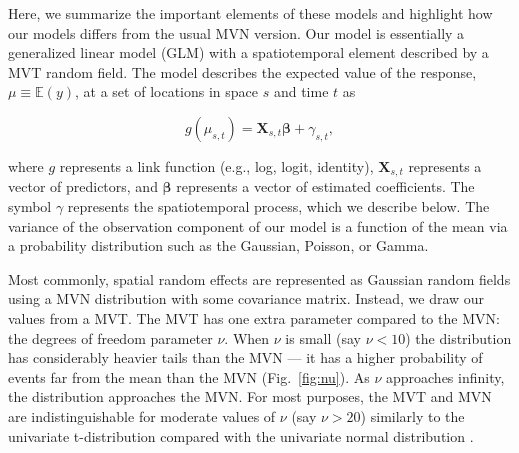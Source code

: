 \documentclass[12pt,english]{article}
\begin{document}
\begin{spacing}{1.3}
Here, we summarize the important elements of these models and highlight how
our models differs from the usual MVN version. Our model is essentially a
generalized linear model (GLM) with a spatiotemporal element described by a
MVT random field. The model describes the expected value of the response, $\mu
\equiv \mathbb{E}(y)$, at a set of locations in space $s$ and time $t$ as

\begin{equation}
  g(\mu_{s,t}) = \bm{X}_{s,t} \bm{\beta} + \gamma_{s,t},
\end{equation}

\noindent where $g$ represents a link function (e.g., log, logit, identity),
$\bm{X}_{s,t}$ represents a vector of predictors, and $\bm{\beta}$ represents a
vector of estimated coefficients.
The symbol $\gamma$ represents the spatiotemporal process,
which we describe below.
The variance of the observation component of
our model is a function of the mean via a
probability distribution such as the Gaussian, Poisson, or Gamma.

Most commonly, spatial random effects are represented as Gaussian random
fields using a MVN distribution with some covariance matrix. Instead, we draw
our values from a MVT. The MVT has one extra parameter compared to the MVN:
the degrees of freedom parameter $\nu$. When $\nu$ is small (say $\nu < 10$)
the distribution has considerably heavier tails than the MVN --- it has a
higher probability of events far from the mean than the MVN
(Fig.~\ref{fig:nu}). As $\nu$ approaches infinity, the distribution approaches
the MVN. For most purposes, the MVT and MVN are indistinguishable for moderate
values of $\nu$ (say $\nu > 20$) similarly to the univariate t-distribution
compared with the univariate normal distribution
\citep[e.g.][]{anderson2017}.


\end{spacing}
\end{document}
